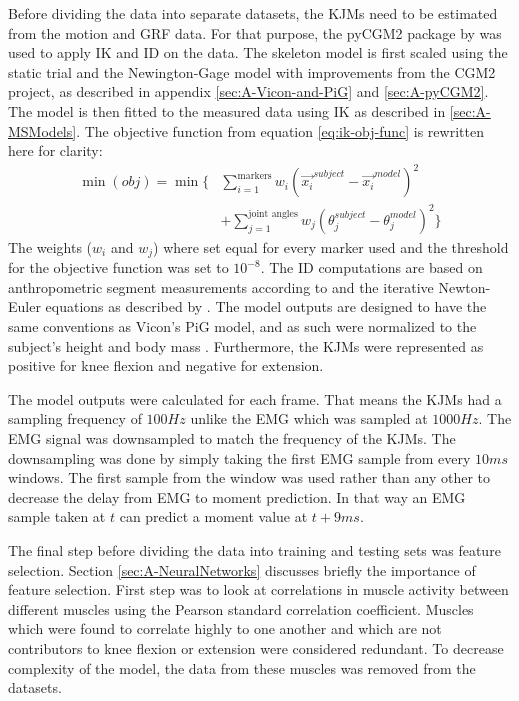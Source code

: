 \documentclass[../main.tex]{subfiles}
\begin{document}
Before dividing the data into separate datasets, the \acp{KJM} need to be estimated from the motion and \ac{GRF} data.
For that purpose, the pyCGM2 package by \textcite{Leboeuf2019} was used to apply \ac{IK} and \ac{ID} on the data.
The skeleton model is first scaled using the static trial and the Newington-Gage model with improvements from the CGM2 project, as described in appendix \ref{sec:A-Vicon-and-PiG} and \ref{sec:A-pyCGM2}.
The model is then fitted to the measured data using \ac{IK} as described in \ref{sec:A-MSModels}. 
The objective function from equation \ref{eq:ik-obj-func} is rewritten here for clarity:
\begin{align*}
    \min(obj) = \min\biggl\{ &\sum_{i=1}^{\text{markers}}w_i \left(\Vec{x_i}^{subject}-\Vec{x_i}^{model}\right)^2 \nonumber\\ 
    &+ \sum_{j=1}^{\text{joint angles}}w_j \left( \theta_j^{subject}-\theta_j^{model}\right)^2 \biggr\}
\end{align*}
The weights ($w_i$ and $w_j$) where set equal for every marker used and the threshold for the objective function was set to $10^{-8}$.
The \ac{ID} computations are based on anthropometric segment measurements according to \textcite{Dempster1955} and the iterative Newton-Euler equations as described by \textcite{Dumas2004}.
The model outputs are designed to have the same conventions as Vicon's \ac{PiG} model, and as such were normalized to the subject's height and body mass \cite{Leboeuf2019, viconpig}.
Furthermore, the \acp{KJM} were represented as positive for knee flexion and negative for extension.

The model outputs were calculated for each frame.
That means the \acp{KJM} had a sampling frequency of $100Hz$ unlike the \ac{EMG} which was sampled at $1000Hz$.
The \ac{EMG} signal was downsampled to match the frequency of the \acp{KJM}. 
The downsampling was done by simply taking the first \ac{EMG} sample from every $10ms$ windows. 
The first sample from the window was used rather than any other to decrease the delay from \ac{EMG} to moment prediction. 
In that way an \ac{EMG} sample taken at $t$ can predict a moment value at $t+9ms$. 

The final step before dividing the data into training and testing sets was feature selection.
Section \ref{sec:A-NeuralNetworks} discusses briefly the importance of feature selection.
First step was to look at correlations in muscle activity between different muscles using the Pearson standard correlation coefficient.
Muscles which were found to correlate highly to one another and which are not contributors to knee flexion or extension were considered redundant.
To decrease complexity of the model, the data from these muscles was removed from the datasets.
\end{document}
